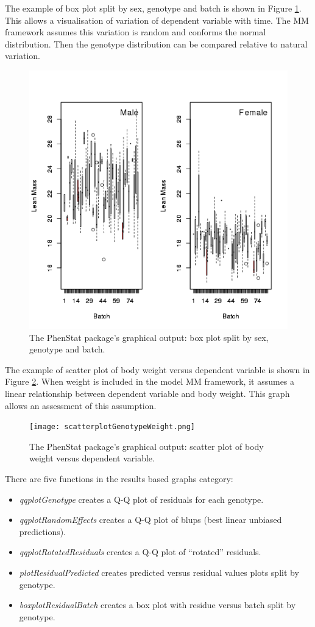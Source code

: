 \documentclass[12pt,a4paper]{article}
\begin{document}
The example of box plot split by sex, genotype and batch is shown in Figure \ref{fig:08}. This allows a visualisation of variation of dependent variable with time. The MM framework assumes this variation is random and conforms the normal distribution. Then the genotype distribution can be compared relative to natural variation. 
\begin{figure}[!htpb]%
\centerline{\includegraphics[scale=0.5]{boxplotSexGenotypeBatch.png}}
\caption{The PhenStat package's graphical output: box plot split by sex, genotype and batch.}\label{fig:08}
\end{figure}

The example of scatter plot of body weight versus dependent variable is shown in Figure \ref{fig:09}. When weight is included in the model MM framework, it assumes a linear relationship between dependent variable and body weight. This graph allows an assessment of this assumption. 
\begin{figure}[!htpb]%
\centerline{\texttt{[image: scatterplotGenotypeWeight.png]}}
\caption{The PhenStat package's graphical output: scatter plot of body weight versus dependent variable.}\label{fig:09}
\end{figure}

There are five functions in the results based graphs category:
\begin{itemize}
\item \textit{qqplotGenotype} creates a Q-Q plot of residuals for each genotype.
\item \textit{qqplotRandomEffects} creates a Q-Q plot of blups (best linear unbiased predictions).
\item \textit{qqplotRotatedResiduals} creates a Q-Q plot of ``rotated'' residuals.
\item \textit{plotResidualPredicted} creates predicted versus residual values plots split by genotype.
\item \textit{boxplotResidualBatch} creates a box plot with residue versus batch split by genotype.
\end{itemize}
\end{document}
